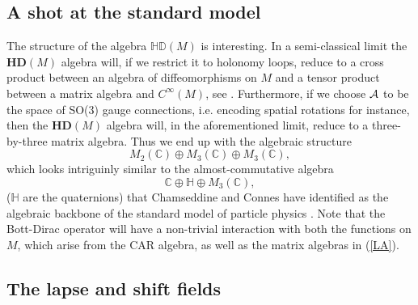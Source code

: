\documentclass[12pt]{article}
\def\ca{{\cal A}}
\begin{document}
\subsection{A shot at the standard model}


The structure of the algebra $ \mathds{HD}(M)$ is interesting. In a semi-classical limit the $\mathbf{HD}(M)$ algebra will, if we restrict it to holonomy loops, reduce to a cross product between an algebra of diffeomorphisms on $M$ and a tensor product between a matrix algebra and $C^\infty(M)$, see \cite{Aastrup:2015gba}. Furthermore, if we choose $\ca$ to be the space of SO(3) gauge connections, i.e. encoding spatial rotations for instance, then the $\mathbf{HD}(M)$ algebra will, in the aforementioned limit, reduce to a three-by-three matrix algebra.
Thus we end up with the algebraic structure
\begin{equation}M_2(\mathbb{C})\oplus M_3(\mathbb{C}) \oplus M_3(\mathbb{C})  ,
\label{LA}
\end{equation}
which looks intriguinly similar to the almost-commutative algebra $$ \mathbb{C} \oplus {\mathbb H}\oplus M_3(\mathbb{C})  ,$$ (${\mathbb H}$ are the quaternions) that Chamseddine and Connes have identified as the algebraic backbone of the standard model of particle physics \cite{Connes:1996gi}. Note that the Bott-Dirac operator will have a non-trivial interaction with both the functions on $M$, which arise from the CAR algebra, as well as the matrix algebras in (\ref{LA}).






\subsection{The lapse and shift fields}
\label{secadd}
\end{document}
